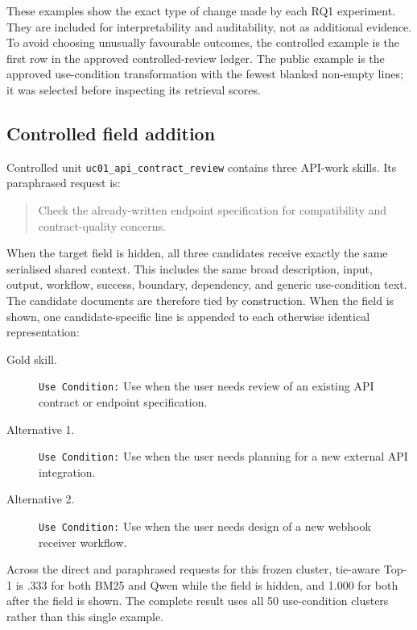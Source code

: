 \begin{singlespace}
These examples show the exact type of change made by each RQ1 experiment. They are included for interpretability and auditability, not as additional evidence. To avoid choosing unusually favourable outcomes, the controlled example is the first row in the approved controlled-review ledger. The public example is the approved use-condition transformation with the fewest blanked non-empty lines; it was selected before inspecting its retrieval scores.

\newpage
\subsection{Controlled field addition}

Controlled unit \texttt{uc01\_api\_contract\_review} contains three API-work skills. Its paraphrased request is:

\begin{quote}\small
Check the already-written endpoint specification for compatibility and contract-quality concerns.
\end{quote}

When the target field is hidden, all three candidates receive exactly the same serialised shared context. This includes the same broad description, input, output, workflow, success, boundary, dependency, and generic use-condition text. The candidate documents are therefore tied by construction. When the field is shown, one candidate-specific line is appended to each otherwise identical representation:

\begin{description}
  \item[Gold skill.] \texttt{Use Condition:} Use when the user needs review of an existing API contract or endpoint specification.
  \item[Alternative 1.] \texttt{Use Condition:} Use when the user needs planning for a new external API integration.
  \item[Alternative 2.] \texttt{Use Condition:} Use when the user needs design of a new webhook receiver workflow.
\end{description}

Across the direct and paraphrased requests for this frozen cluster, tie-aware Top-1 is .333 for both BM25 and Qwen while the field is hidden, and 1.000 for both after the field is shown. The complete result uses all 50 use-condition clusters rather than this single example.


\end{singlespace}
